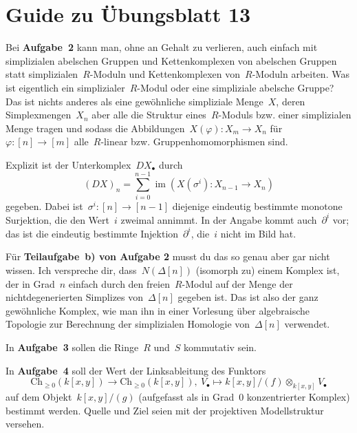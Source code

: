 \documentclass{uebblatt}
\newcommand{\Ch}{\mathrm{Ch}}
\begin{document}
\section*{Guide zu Übungsblatt 13}

Bei \textbf{Aufgabe~2} kann man, ohne an Gehalt zu verlieren, auch einfach mit
simplizialen abelschen Gruppen und Kettenkomplexen von abelschen Gruppen
statt simplizialen~$R$-Moduln und Kettenkomplexen von~$R$-Moduln arbeiten. Was
ist eigentlich ein simplizialer~$R$-Modul oder eine simpliziale abelsche
Gruppe? Das ist nichts anderes als eine gewöhnliche simpliziale Menge~$X$,
deren Simplexmengen~$X_n$ aber alle die Struktur eines~$R$-Moduls bzw. einer
simplizialen Menge tragen und sodass die Abbildungen~$X(\varphi) : X_m \to X_n$
für~$\varphi : [n] \to [m]$ alle~$R$-linear bzw. Gruppenhomomorphismen sind.

Explizit ist der Unterkomplex~$DX_\bullet$ durch
\[ (DX)_n = \sum_{i=0}^{n-1} \operatorname{im}(X(\sigma^i) : X_{n-1} \to X_n) \]
gegeben. Dabei ist~$\sigma^i : [n] \to [n-1]$ diejenige eindeutig bestimmte
monotone Surjektion, die den Wert~$i$ zweimal annimmt. In der Angabe kommt
auch~$\partial^i$ vor; das ist die eindeutig bestimmte Injektion~$\partial^i$,
die~$i$ nicht im Bild hat.

Für \textbf{Teilaufgabe~b) von Aufgabe 2} musst du das so genau aber gar nicht
wissen. Ich verspreche dir, dass~$N(\Delta[n])$ (isomorph zu) einem Komplex
ist, der in Grad~$n$ einfach durch den freien~$R$-Modul auf der Menge der
nichtdegenerierten Simplizes von~$\Delta[n]$ gegeben ist. Das ist also der ganz
gewöhnliche Komplex, wie man ihn in einer Vorlesung über algebraische Topologie
zur Berechnung der simplizialen Homologie von~$\Delta[n]$ verwendet.

In \textbf{Aufgabe~3} sollen die Ringe~$R$ und~$S$ kommutativ sein.

In \textbf{Aufgabe~4} soll der Wert der Linksableitung des Funktors
\[ \Ch_{\geq0}(k[x,y]) \longrightarrow \Ch_{\geq0}(k[x,y]),\
  V_\bullet \longmapsto k[x,y]/(f) \otimes_{k[x,y]} V_\bullet \]
auf dem Objekt~$k[x,y]/(g)$ (aufgefasst als in Grad~$0$ konzentrierter Komplex)
bestimmt werden. Quelle und Ziel seien mit der projektiven Modellstruktur
versehen.
\end{document}
